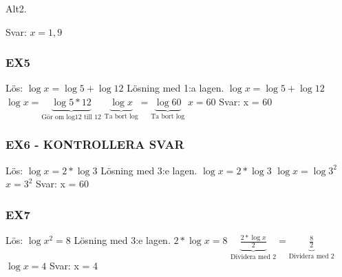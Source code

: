 \documentclass[a4paper,10pt]{article}
\begin{document}
\begin{flushleft}
    Alt2.\newline

    Svar: $ x = 1,9$

  \subsubsection{EX5}
    Lös: $\log{x} = \log{5}+\log{12}$\newline
    Lösning med 1:a lagen.\newline\newline
    $ \log{x} = \log{5}+\log{12} $\newline
    $ \log{x} = \underbrace{\log{5*12}}_{\text{Gör om log12 till 12}} $ \newline\newline
    $ \underbrace{\log{x}}_{\text{Ta bort log}} = \underbrace{\log{60}}_{\text{Ta bort log}}  $\newline\newline
    $ x = 60$\newline
    Svar: x = 60

  \subsubsection{EX6 - KONTROLLERA SVAR}
    Lös: $\log{x} = 2*\log{3}$\newline
    Lösning med 3:e lagen. \newline\newline
    $ \log{x} = 2*\log{3} $\newline
    $ \log{x} = \log{3^2} $ \newline\newline
    $ x = 3^2 $\newline\newline
    Svar: x = 60

  \subsubsection{EX7}
    Lös: $\log{x^2} = 8$\newline
    Lösning med 3:e lagen. \newline\newline
    $ 2*\log{x} = 8 $\newline\newline
    $ \underbrace{\frac{2*\log{x}}{2}}_{\text{Dividera med 2}} = \underbrace{\frac{8}{2}}_{\text{Dividera med 2}}  $ \newline\newline
    $ \log{x} = 4 $\newline\newline
    Svar: x = 4


\end{flushleft}
\end{document}
